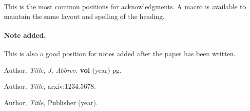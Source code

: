 \documentclass[a4paper,10pt]{article}
\begin{document}
\acknowledgments

This is the most common positions for acknowledgments. A macro is
available to maintain the same layout and spelling of the heading.

\paragraph{Note added.} This is also a good position for notes added
after the paper has been written.






\begin{thebibliography}{99}

Author, \emph{Title}, \emph{J. Abbrev.} {\bf vol} (year) pg.

Author, \emph{Title},
arxiv:1234.5678.

Author, \emph{Title},
Publisher (year).





\end{thebibliography}
\end{document}
